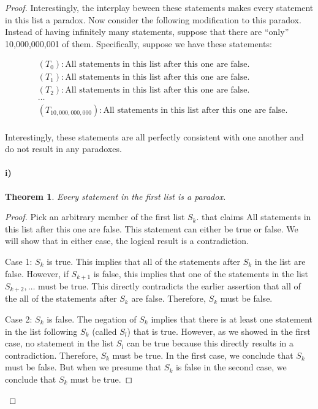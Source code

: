 \documentclass[10pt,letter]{article}
\newtheorem*{thm}{Theorem}
\begin{document}
\begin{proof}

Interestingly, the interplay beween these statements makes every statement in this list a paradox. Now consider the following modification to this paradox. Instead of having infinitely many statements, suppose that there are ``only'' 10,000,000,001 of them. Specifically, suppose we have these statements:

\begin{align*}
&(T_0): \text{All statements in this list after this one are false.}\\
&(T_1): \text{All statements in this list after this one are false.}\\
&(T_2): \text{All statements in this list after this one are false.}\\
&\ldots\\
&(T_{10,000,000,000}): \text{All statements in this list after this one are false.}\\
\end{align*}

Interestingly, these statements are all perfectly consistent with one another and do not result in any paradoxes.

\paragraph{i)}
\begin{thm}Every statement in the first list is a paradox.\end{thm}
\begin{proof}Pick an arbitrary member of the first list $S_k$. that claims All statements in this list after this one are false. This statement can either be true or false. We will show that in either case, the logical result is a contradiction.
\item Case 1: $S_k$ is true. This implies that all of the statements after $S_k$ in the list are false. However, if $S_{k+1}$ is false, this implies that one of the statements in the list $S_{k+2}, \ldots$ must be true. This directly contradicts the earlier assertion that all of the all of the statements after $S_k$ are false. Therefore, $S_k$ must be false.
\item Case 2: $S_k$ is false. The negation of $S_k$ implies that there is at least one statement in the list following $S_k$ (called $S_l$) that is true. However, as we showed in the first case, no statement in the list $S_l$ can be true because this directly results in a contradiction. Therefore, $S_k$ must be true.
In the first case, we conclude that $S_k$ must be false. But when we presume that $S_k$ is false in the second case, we conclude that $S_k$ must be true. 
\end{proof}


\end{proof}
\end{document}
